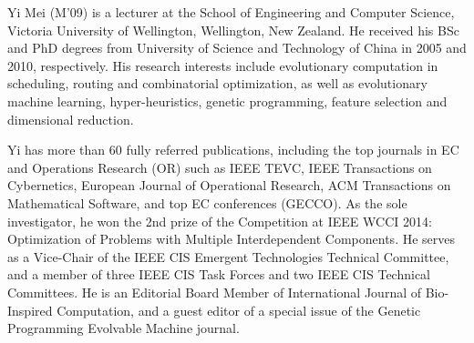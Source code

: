 \documentclass[10pt,journal,compsoc]{IEEEtran}
\begin{document}
\begin{IEEEbiography}{Yi Mei} (M’09)
is a lecturer at the School of Engineering and Computer Science, Victoria University of Wellington, Wellington, New Zealand. He received his BSc and PhD degrees from University of Science and Technology of China in 2005 and 2010, respectively. His research interests include evolutionary computation in scheduling, routing and combinatorial optimization, as well as evolutionary machine learning, hyper-heuristics, genetic programming, feature selection and dimensional reduction.

Yi has more than 60 fully referred publications, including the top journals in EC and Operations Research (OR) such as IEEE TEVC, IEEE Transactions on Cybernetics, European Journal of Operational Research, ACM Transactions on Mathematical Software, and top EC conferences (GECCO). As the sole investigator, he won the 2nd prize of the Competition at IEEE WCCI 2014: Optimization of Problems with Multiple Interdependent Components. He serves as a Vice-Chair of the IEEE CIS Emergent Technologies Technical Committee, and a member of three IEEE CIS Task Forces and two IEEE CIS Technical Committees. He is an Editorial Board Member of International Journal of Bio-Inspired Computation, and a guest editor of a special issue of the Genetic Programming Evolvable Machine journal. 
\end{IEEEbiography}
\end{document}
